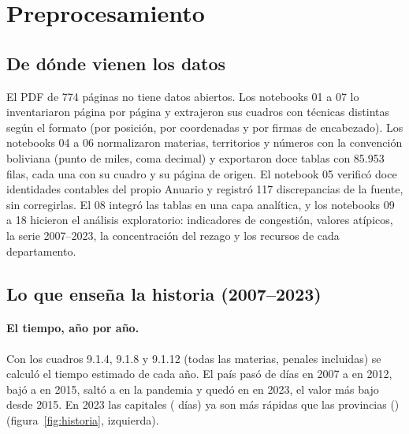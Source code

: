 \documentclass[11pt,a4paper]{article}
\begin{document}
\section{Preprocesamiento}

\subsection{De dónde vienen los datos}
El PDF de 774 páginas no tiene datos abiertos. Los notebooks 01 a 07 lo inventariaron página por página y extrajeron sus
cuadros con técnicas distintas según el formato (por posición, por coordenadas y por firmas de encabezado). Los notebooks
04 a 06 normalizaron materias, territorios y números con la convención boliviana (punto de miles, coma decimal) y
exportaron doce tablas con 85.953 filas, cada una con su cuadro y su página de origen. El notebook 05 verificó doce
identidades contables del propio Anuario y registró 117 discrepancias de la fuente, sin corregirlas. El 08 integró las
tablas en una capa analítica, y los notebooks 09 a 18 hicieron el análisis exploratorio: indicadores de congestión,
valores atípicos, la serie 2007--2023, la concentración del rezago y los recursos de cada departamento.

\subsection{Lo que enseña la historia (2007--2023)}

\paragraph{El tiempo, año por año.} Con los cuadros 9.1.4, 9.1.8 y 9.1.12 (todas las materias, penales incluidas) se
calculó el tiempo estimado de cada año. El país pasó de \histTiempoDosmilsiete{} días en 2007 a \histTiempoDosmildoce{} en
2012, bajó a \histTiempoDosmilquince{} en 2015, saltó a \histTiempoDosmilveinte{} en la pandemia y quedó en
\histTiempoDosmilveintitres{} en 2023, el valor más bajo desde 2015. En 2023 las capitales (\histCapitalDosmilveintitres{}
días) ya son más rápidas que las provincias (\histProvinciaDosmilveintitres) (figura~\ref{fig:historia}, izquierda).
\end{document}
